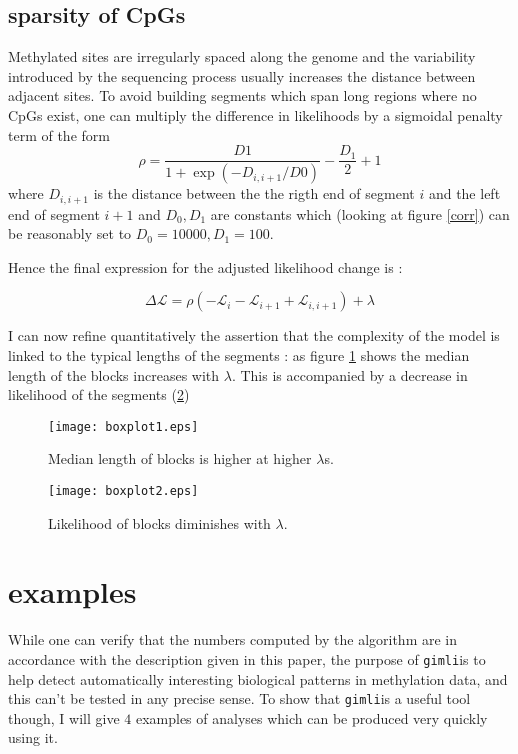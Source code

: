 \documentclass[12pt]{amsart}
\newcommand{\lik}{\ensuremath{\mathcal{L}}}
\newcommand{\gimli}{\texttt{gimli}}
\begin{document}
\subsection{sparsity of CpGs}

Methylated sites are irregularly spaced along the genome and the variability 
introduced by the sequencing process usually increases the distance 
between adjacent sites.
To avoid building segments which span long regions where no CpGs exist, one 
can multiply the difference in likelihoods by a sigmoidal penalty term of the
form \[\rho=\frac{D1}{1+\exp(-D_{i,i+1}/D0)}-\frac{D_1}{2}+1\] where $D_{i,i+1}$ is the distance 
between the the rigth end of segment $i$ and the left end of segment $i+1$ and 
$D_0,D_1$ are constants which (looking at figure \ref{corr}) can be reasonably 
set to $D_0=10000,D_1=100$. 

Hence the final expression for the adjusted likelihood change is :

\begin{equation}
\Delta \lik = \rho ( -\mathcal{L}_i-\mathcal{L}_{i+1}+\mathcal{L}_{i,i+1} )  +\lambda
\end{equation}

I can now refine quantitatively the assertion that the complexity of the model
is linked to the typical lengths of the segments : as figure \ref{boxplot1} 
shows the median length of the blocks increases with $\lambda$. This is 
accompanied by a decrease in likelihood of the segments (\ref{boxplot2})

\begin{figure}\label{boxplot1}
\texttt{[image: boxplot1.eps]}
\caption{Median length of blocks is higher at higher $\lambda$s.}
\end{figure}

\begin{figure}\label{boxplot2}
\texttt{[image: boxplot2.eps]}
\caption{Likelihood of blocks diminishes with $\lambda$.}
\end{figure}

\section{examples}

While one can verify that the numbers computed by the algorithm are in 
accordance with the description
given in this paper, the purpose of \gimli is to help 
detect automatically interesting
biological patterns in methylation data, and this can't be tested in any 
precise sense. To show that \gimli is a useful tool
though, I will give $4$ examples of analyses which can be produced very quickly
using it. 
\end{document}
